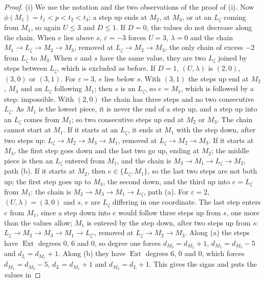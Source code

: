\documentclass[11pt,reqno]{amsart}
\theoremstyle{plain}
\theoremstyle{definition}
\theoremstyle{remark}
\DeclareMathOperator{\Ext}{Ext}
\begin{document}
\begin{proof}
(i) We use the notation and the two observations of the proof of
(i). Now $\phi(M_{1})=t_{1}<p<t_{2}<t_{3}$; a step up
ends at $M_{2}$, at $M_{3}$, or at an $L_{\zeta}$ coming from $M_{1}$, so
again $U\le3$ and $D\le1$. If $D=0$, the values do not decrease along the
chain. When $e$ lies above $s$, $\varepsilon=-3$ forces $U=3$, $\lambda=0$
and the chain $M_{1}\to L_{\zeta}\to M_{2}\to M_{3}$, removed at
$L_{\zeta}\to M_{2}\to M_{3}$, the only chain of excess $-2$ from
$L_{\zeta}$ to $M_{3}$. When $e$ and $s$ have the same value, they are two
$L_{\zeta}$ joined by steps between $L_{\zeta}$, which is excluded as before.
If $D=1$, $(U,\lambda)$ is $(2,0)$, $(3,0)$ or $(3,1)$. For
$\varepsilon=3$, $e$ lies below $s$. With $(3,1)$ the steps up end at
$M_{2}$, $M_{3}$ and an $L_{\zeta}$ following $M_{1}$; then $s$ is an
$L_{\zeta}$, so $e=M_{1}$, which is followed by a step: impossible. With
$(2,0)$ the chain has three steps and no two consecutive $L_{\zeta}$. As
$M_{1}$ is the lowest piece, it is never the end of a step up, and a step up
into an $L_{\zeta}$ comes from $M_{1}$; so two consecutive steps up end at
$M_{2}$ or $M_{3}$. The chain cannot start at $M_{1}$. If it starts at an
$L_{\zeta}$, it ends at $M_{1}$ with the step down, after two steps up:
$L_{\zeta}\to M_{2}\to M_{3}\to M_{1}$, removed at $L_{\zeta}\to M_{2}\to
M_{3}$. If it starts at $M_{3}$, the first step goes down and the last two
go up, ending at $M_{2}$; the middle piece is then an $L_{\zeta}$ entered
from $M_{1}$, and the chain is $M_{3}\to M_{1}\to L_{\zeta}\to M_{2}$, path
(b). If it starts at $M_{2}$, then $e\in\{L_{\zeta},M_{1}\}$, so the last two
steps are not both up; the first step goes up to $M_{3}$, the second down,
and the third up into $e=L_{\zeta}$ from $M_{1}$: the chain is $M_{2}\to
M_{3}\to M_{1}\to L_{\zeta}$, path (a). For $\varepsilon=2$,
$(U,\lambda)=(3,0)$ and $s$, $e$ are $L_{\zeta}$ differing in one
coordinate. The last step enters $e$ from $M_{1}$, since a step down into
$e$ would follow three steps up from $s$, one more than the values allow;
$M_{1}$ is entered by the step down, after two steps up from $s$:
$L_{\zeta}\to M_{2}\to M_{3}\to M_{1}\to L_{\zeta'}$, removed at
$L_{\zeta}\to M_{2}\to M_{3}$.
Along (a) the steps have $\Ext$ degrees $0$, $6$ and $0$, so degree one
forces $d_{M_{3}}=d_{M_{2}}+1$, $d_{M_{1}}=d_{M_{3}}-5$ and
$d_{L}=d_{M_{1}}+1$. Along (b) they have $\Ext$ degrees $6$, $0$ and $0$,
which forces $d_{M_{1}}=d_{M_{3}}-5$, $d_{L}=d_{M_{1}}+1$ and
$d_{M_{2}}=d_{L}+1$. This gives the signs and puts the values in

\end{proof}
\end{document}

